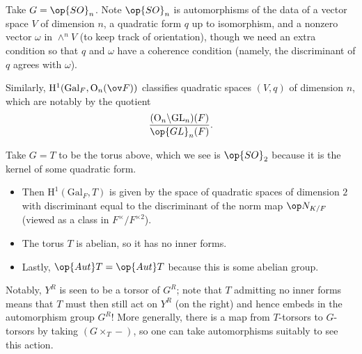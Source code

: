 \documentclass[../notes.tex]{subfiles}
\begin{document}
\begin{example}
	Take $G=\op{SO}_n$. Note $\op{SO}_n$ is automorphisms of the data of a vector space $V$ of dimension $n$, a quadratic form $q$ up to isomorphism, and a nonzero vector $\omega$ in $\land^nV$ (to keep track of orientation), though we need an extra condition so that $q$ and $\omega$ have a coherence condition (namely, the discriminant of $q$ agrees with $\omega$). 
\end{example}
\begin{example}
	Similarly, $\mathrm H^1(\mathrm{Gal}_F,\mathrm O_n(\ov F))$ classifies quadratic spaces $(V,q)$ of dimension $n$, which are notably by the quotient
	\[\frac{(\mathrm O_n\backslash\mathrm{GL}_n)(F)}{\op{GL}_n(F)}.\]
\end{example}
\begin{example}
	Take $G=T$ to be the torus above, which we see is $\op{SO}_2$ because it is the kernel of some quadratic form.
	\begin{itemize}
		\item Then $\mathrm H^1(\mathrm{Gal}_F,T)$ is given by the space of quadratic spaces of dimension $2$ with discriminant equal to the discriminant of the norm map $\op N_{K/F}$ (viewed as a class in $F^\times/F^{\times2}$).
		\item The torus $T$ is abelian, so it has no inner forms.
		\item Lastly, $\op{Aut}T=\op{Aut}T$ because this is some abelian group.
	\end{itemize}
\end{example}
Notably, $Y^R$ is seen to be a torsor of $G^R$; note that $T$ admitting no inner forms means that $T$ must then still act on $Y^R$ (on the right) and hence embeds in the automorphism group $G^R$! More generally, there is a map from $T$-torsors to $G$-torsors by taking $(G\times_T-)$, so one can take automorphisms suitably to see this action.
\end{document}
